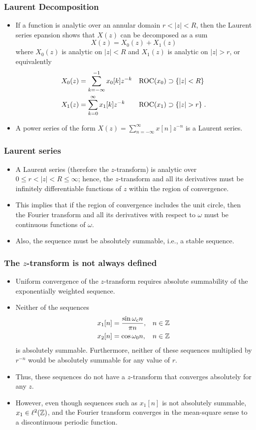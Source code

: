 \begin{frame}
\frametitle{Laurent Decomposition}
\begin{itemize}
\item If a function is analytic over an annular domain $r < |z| < R$, then the Laurent series epansion
shows that $X(z)$ can be decomposed as a sum
$$
X(z)= X_0(z) + X_1(z)
$$
where $X_0(z)$ is analytic on $|z| < R$ and $X_1(z)$ is analytic on $|z| > r$, or equivalently
\begin{align*}
X_0(z)&= \sum_{k=-\infty}^{-1} x_0[k] z^{-k}    && \mathrm{ROC}(x_0) \supset  \{ |z| < R \}    \\
X_1(z)&= \sum_{k=0}^\infty x_1[k] z^{-k} && \mathrm{ROC}(x_1) \supset \{ |z| > r \} \;.
\end{align*}
\item A power series of the form $X(z)= \sum_{n=-\infty}^\infty x[n] z^{-n}$ is a \alert{Laurent series}. 
\end{itemize}
\end{frame}

\begin{frame}
\frametitle{Laurent series}
\begin{itemize}
\item A Laurent series (therefore the $z$-transform) is analytic over $0 \leq r < |z| < R \leq \infty$; hence, the $z$-transform and all its derivatives must be infinitely differentiable functions of $z$ within the region of convergence.
\item This implies that if the region of convergence includes the unit circle, then the Fourier transform and all its derivatives with respect to $\omega$ must be continuous functions of $\omega$. 
\item Also,  the sequence must be absolutely summable, i.e., a stable sequence.
\end{itemize}
\end{frame}

\begin{frame}
\frametitle{The $z$-transform is not always defined}
\begin{itemize}
\item Uniform convergence of the $z$-transform requires absolute summability of the exponentially weighted sequence.
\item Neither of the sequences
\begin{align*}
x_{1}[n] &=\frac{\sin\omega_{c}n}{\pi n}, && n \in \mathbb{Z} \\
x_{2}[n] &=\cos\omega_{0}n,&& n \in \mathbb{Z} 
\end{align*}
is absolutely summable. Furthermore, neither of these sequences multiplied by $r^{-n}$ would be absolutely summable for any value of $r$. 
\item Thus, these sequences do not have a $z$-transform that converges absolutely for any $z$. 
\item However,  even though sequences such as $x_{1}[n]$ is not absolutely summable, $x_1 \in \ell^2(\mathbb{Z})$, and the Fourier transform converges in the mean-square sense to a discontinuous periodic function. 
\end{itemize}
\end{frame}

